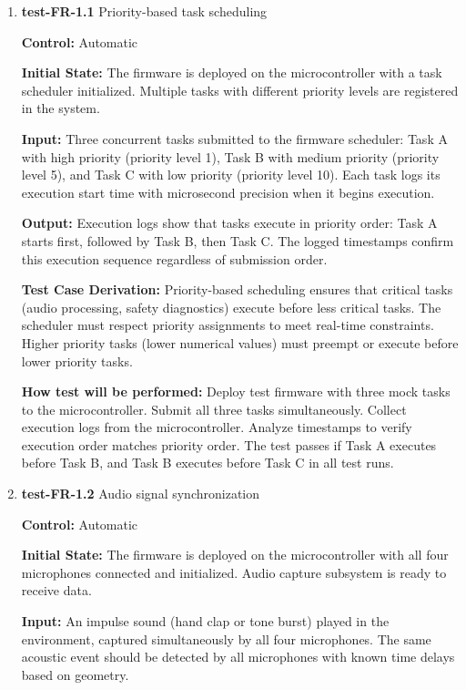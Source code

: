 \documentclass[12pt, titlepage]{article}
\begin{document}
\begin{enumerate}

\item{\textbf{test-FR-1.1} Priority-based task scheduling \\}

\textbf{Control:} Automatic
					
\textbf{Initial State:} 
The firmware is deployed on the microcontroller with a task scheduler initialized. 
Multiple tasks with different priority levels are registered in the system.
					
\textbf{Input:}
Three concurrent tasks submitted to the firmware scheduler: Task A with high 
priority (priority level 1), Task B with medium priority (priority level 5), 
and Task C with low priority (priority level 10). Each task logs its execution 
start time with microsecond precision when it begins execution.
					
\textbf{Output:}
Execution logs show that tasks execute in priority order: Task A starts first, 
followed by Task B, then Task C. The logged timestamps confirm this execution 
sequence regardless of submission order.

\textbf{Test Case Derivation:} 
Priority-based scheduling ensures that critical tasks (audio processing, safety 
diagnostics) execute before less critical tasks. The scheduler must respect 
priority assignments to meet real-time constraints. Higher priority tasks 
(lower numerical values) must preempt or execute before lower priority tasks.
					
\textbf{How test will be performed:}
Deploy test firmware with three mock tasks to the microcontroller. Submit all 
three tasks simultaneously. Collect execution logs from the microcontroller. 
Analyze timestamps to verify execution order matches priority order. The test 
passes if Task A executes before Task B, and Task B executes before Task C 
in all test runs.

\item{\textbf{test-FR-1.2} Audio signal synchronization\\}

\textbf{Control:} Automatic
					
\textbf{Initial State:} 
The firmware is deployed on the microcontroller with all four microphones 
connected and initialized. Audio capture subsystem is ready to receive data.
					
\textbf{Input:}
An impulse sound (hand clap or tone burst) played in the environment, captured 
simultaneously by all four microphones. The same acoustic event should be 
detected by all microphones with known time delays based on geometry.
					

\end{enumerate}
\end{document}
